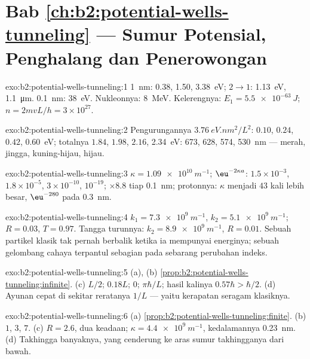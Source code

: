 \section*{Bab \ref{ch:b2:potential-wells-tunneling} --- Sumur Potensial, Penghalang dan Penerowongan}

\begin{solution}{exo:b2:potential-wells-tunneling:1}
\qty{1}{nm}: \qty{0.38}{}, \qty{1.50}{}, \qty{3.38}{eV}; $2 \to 1$: \qty{1.13}{eV}, \qty{1.1}{\micro m}.
\qty{0.1}{nm}: \qty{38}{eV}. Nukleonnya: \qty{8}{MeV}. Kelerengnya: $E_1 = \qty{5.5e-63}{J}$;
$n = 2mvL/h = 3 \times 10^{27}$.
\end{solution}

\begin{solution}{exo:b2:potential-wells-tunneling:2}
Pengurungannya $\qty{3.76}{eV.nm^2}/L^2$: $0.10$, $0.24$, $0.42$, \qty{0.60}{eV}; totalnya
$1.84$, $1.98$, $2.16$, \qty{2.34}{eV}: \qty{673}{}, \qty{628}{}, \qty{574}{}, \qty{530}{nm} ---
merah, jingga, kuning-hijau, hijau.
\end{solution}

\begin{solution}{exo:b2:potential-wells-tunneling:3}
$\kappa = \qty{1.09e10}{m^{-1}}$; $\eu^{-2\kappa a}$: $1.5 \times 10^{-3}$, $1.8 \times 10^{-5}$,
$3 \times 10^{-10}$, $10^{-19}$; $\times 8.8$ tiap \qty{0.1}{nm}; protonnya: $\kappa$ menjadi
$43$ kali lebih besar, $\eu^{-280}$ pada \qty{0.3}{nm}.
\end{solution}

\begin{solution}{exo:b2:potential-wells-tunneling:4}
$k_1 = \qty{7.3e9}{m^{-1}}$, $k_2 = \qty{5.1e9}{m^{-1}}$; $R = 0.03$, $T = 0.97$. Tangga
turunnya: $k_2 = \qty{8.9e9}{m^{-1}}$, $R = 0.01$. Sebuah partikel klasik tak pernah
berbalik ketika ia mempunyai energinya; sebuah gelombang cahaya terpantul sebagian
pada sebarang perubahan indeks.
\end{solution}

\begin{solution}{exo:b2:potential-wells-tunneling:5}
(a), (b) \cref{prop:b2:potential-wells-tunneling:infinite}. (c) $L/2$;
$0.18L$; $0$; $\pi\hbar/L$; hasil kalinya $0.57\hbar > \hbar/2$. (d) Ayunan
cepat di sekitar reratanya $1/L$ --- yaitu kerapatan seragam klasiknya.
\end{solution}

\begin{solution}{exo:b2:potential-wells-tunneling:6}
(a) \cref{prop:b2:potential-wells-tunneling:finite}. (b) $1$, $3$, $7$.
(c) $R = 2.6$, dua keadaan; $\kappa = \qty{4.4e9}{m^{-1}}$, kedalamannya \qty{0.23}{nm}. (d)
Takhingga banyaknya, yang cenderung ke aras sumur takhingganya dari bawah.
\end{solution}


